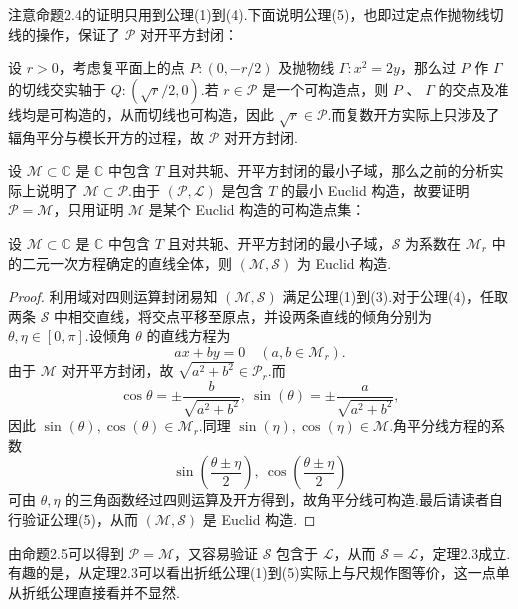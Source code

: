 注意命题2.4的证明只用到公理(1)到(4).下面说明公理(5)，也即过定点作抛物线切线的操作，保证了 $\mathcal{P}$ 对开平方封闭：

设 $r>0$，考虑复平面上的点 $P:(0,-r/2)$ 及抛物线 $\Gamma:x^2=2y$，那么过 $P$ 作 $\Gamma$ 的切线交实轴于 $Q:(\sqrt{r}/2,0)$.若 $r\in\mathcal{P}$ 是一个可构造点，则 $P$ 、 $\Gamma$ 的交点及准线均是可构造的，从而切线也可构造，因此 $\sqrt{r}\in\mathcal{P}$.而复数开方实际上只涉及了辐角平分与模长开方的过程，故 $\mathcal{P}$ 对开方封闭.

设 $\mathcal{M}\subset\mathbb{C}$ 是 $\mathbb{C}$ 中包含 $T$ 且对共轭、开平方封闭的最小子域，那么之前的分析实际上说明了 $\mathcal{M}\subset\mathcal{P}$.由于 $(\mathcal{P},\mathcal{L})$ 是包含 $T$ 的最小 Euclid 构造，故要证明 $\mathcal{P}=\mathcal{M}$，只用证明 $\mathcal{M}$ 是某个 Euclid 构造的可构造点集：

\begin{proposition}
    设 $\mathcal{M}\subset\mathbb{C}$ 是 $\mathbb{C}$ 中包含 $T$ 且对共轭、开平方封闭的最小子域，$\mathcal{S}$ 为系数在 $\mathcal{M}_r$ 中的二元一次方程确定的直线全体，则 $(\mathcal{M},\mathcal{S})$ 为 Euclid 构造.
\end{proposition}

\begin{proof}
    利用域对四则运算封闭易知 $(\mathcal{M},\mathcal{S})$ 满足公理(1)到(3).对于公理(4)，任取两条 $\mathcal{S}$ 中相交直线，将交点平移至原点，并设两条直线的倾角分别为 $\theta,\eta\in[0,\pi]$.设倾角 $\theta$ 的直线方程为
    $$
    ax+by=0\quad (a,b\in\mathcal{M}_r).
    $$
    由于 $\mathcal{M}$ 对开平方封闭，故 $\sqrt{a^2+b^2}\in\mathcal{P}_r$.而
    $$
    \cos{\theta}=\pm\frac{b}{\sqrt{a^2+b^2}},\ \sin(\theta)=\pm\frac{a}{\sqrt{a^2+b^2}},
    $$
    因此 $\sin(\theta),\cos(\theta)\in\mathcal{M}_r$.同理 $\sin(\eta),\cos(\eta)\in\mathcal{M}$.角平分线方程的系数
    $$
    \sin(\frac{\theta\pm\eta}{2}),\ \cos(\frac{\theta\pm\eta}{2})
    $$
    可由 $\theta,\eta$ 的三角函数经过四则运算及开方得到，故角平分线可构造.最后请读者自行验证公理(5)，从而 $(\mathcal{M},\mathcal{S})$ 是 Euclid 构造.
\end{proof}

由命题2.5可以得到 $\mathcal{P}=\mathcal{M}$，又容易验证 $\mathcal{S}$ 包含于 $\mathcal{L}$，从而 $\mathcal{S}=\mathcal{L}$，定理2.3成立.有趣的是，从定理2.3可以看出折纸公理(1)到(5)实际上与尺规作图等价，这一点单从折纸公理直接看并不显然.